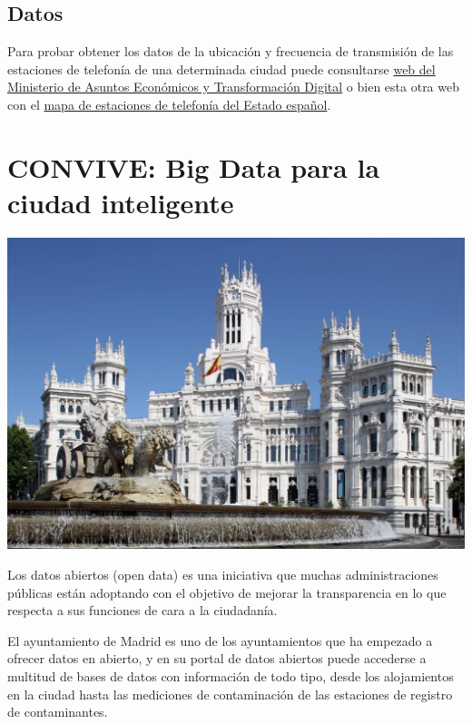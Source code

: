 \documentclass[
  a4paper,
]{scrreport}
\begin{document}
\hypertarget{datos-1}{%
\section{Datos}\label{datos-1}}

Para probar obtener los datos de la ubicación y frecuencia de
transmisión de las estaciones de telefonía de una determinada ciudad
puede consultarse
\href{https://geoportal.minetur.gob.es/VCTEL/vcne.do}{web del Ministerio
de Asuntos Económicos y Transformación Digital} o bien esta otra web con
el \href{https://antenasgsm.com/}{mapa de estaciones de telefonía del
Estado español}.


\hypertarget{convive-big-data-para-la-ciudad-inteligente}{%
\chapter{CONVIVE: Big Data para la ciudad
inteligente}\label{convive-big-data-para-la-ciudad-inteligente}}

\includegraphics{./img/convive/ayuntamiento-madrid.jpg}

Los datos abiertos (open data) es una iniciativa que muchas
administraciones públicas están adoptando con el objetivo de mejorar la
transparencia en lo que respecta a sus funciones de cara a la
ciudadanía.

El ayuntamiento de Madrid es uno de los ayuntamientos que ha empezado a
ofrecer datos en abierto, y en su portal de datos abiertos puede
accederse a multitud de bases de datos con información de todo tipo,
desde los alojamientos en la ciudad hasta las mediciones de
contaminación de las estaciones de registro de contaminantes.
\end{document}
